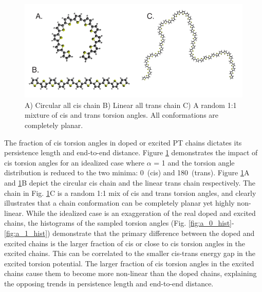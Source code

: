 \begin{figure}[hbt!]
    \centering
    \includegraphics{figures/chap2/planar_chains.pdf}
    \caption{A) Circular all cis chain B) Linear all trans chain C) A random 1:1 mixture of cis and trans torsion angles. All conformations are completely planar.}
    \label{fig:ideal}
\end{figure}

The fraction of cis torsion angles in doped or excited PT chains dictates its persistence length and end-to-end distance. Figure \ref{fig:ideal} demonstrates the impact of cis torsion angles for an idealized case where $\alpha$ = 1 and the torsion angle distribution is reduced to the two minima: 0\textdegree \ (cis) and 180\textdegree \ (trans). Figure \ref{fig:ideal}{\color{blue}A} and \ref{fig:ideal}{\color{blue}B} depict the circular cis chain and the linear trans chain respectively. The chain in Fig. \ref{fig:ideal}{\color{blue}C} is a random 1:1 mix of cis and trans torsion angles, and clearly illustrates that a chain conformation can be completely planar yet highly non-linear. While the idealized case is an exaggeration of the real doped and excited chains, the histograms of the sampled torsion angles (Fig. \ref{fig:a_0_hist}-\ref{fig:a_1_hist}) demonstrate that the primary difference between the doped and excited chains is the larger fraction of cis or close to cis torsion angles in the excited chains. This can be correlated to the smaller cis-trans energy gap in the excited torsion potential. The larger fraction of cis torsion angles in the excited chains cause them to become more non-linear than the doped chains, explaining the opposing trends in persistence length and end-to-end distance.

